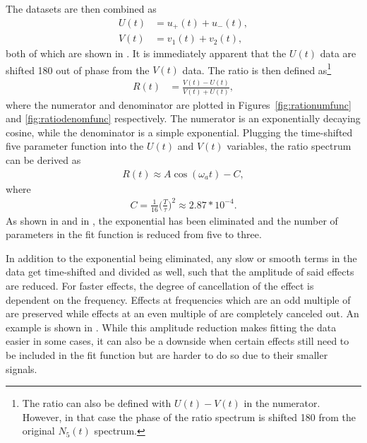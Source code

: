 The datasets are then combined as 
    \begin{equation}
    \begin{aligned}
        U(t) &= u_{+}(t) + u_{-}(t), \\
        V(t) &= v_{1}(t) + v_{2}(t),
    \label{eq:UandV}
    \end{aligned}
    \end{equation}
both of which are shown in . It is immediately apparent that the $U(t)$ data are shifted 180\textdegree{} out of phase from the $V(t)$ data. The ratio is then defined as\footnote{The ratio can also be defined with $U(t) - V(t)$ in the numerator. However, in that case the phase of the ratio spectrum is shifted 180\textdegree{} from the original $N_{5}(t)$ spectrum.}
    \begin{align}
        R(t) &= \frac{V(t) - U(t)}{V(t) + U(t)},
    \label{eq:ratioUV}
    \end{align}
where the numerator and denominator are plotted in Figures~\ref{fig:rationumfunc} and \ref{fig:ratiodenomfunc} respectively. The numerator is an exponentially decaying cosine, while the denominator is a simple exponential. Plugging the time-shifted five parameter function into the $U(t)$ and $V(t)$ variables, the ratio spectrum can be derived as
    \begin{align}
        R(t) \approx A \cos(\omega_{a}t) - C,
    \label{eq:ratiowithC}
    \end{align}    
where  
    \begin{align}
        C = \frac{1}{16} \Big(\frac{T}{\tau}\Big)^{2} \approx 2.87 * 10^{-4}.
    \end{align}
As shown in  and in , the exponential has been eliminated and the number of parameters in the fit function is reduced from five to three.

In addition to the exponential being eliminated, any slow or smooth terms in the data get time-shifted and divided as well, such that the amplitude of said effects are reduced. For faster effects, the degree of cancellation of the effect is dependent on the frequency. Effects at frequencies which are an odd multiple of \wa are preserved while effects at an even multiple of \wa are completely canceled out. An example is shown in . While this amplitude reduction makes fitting the data easier in some cases, it can also be a downside when certain effects still need to be included in the fit function but are harder to do so due to their smaller signals.


